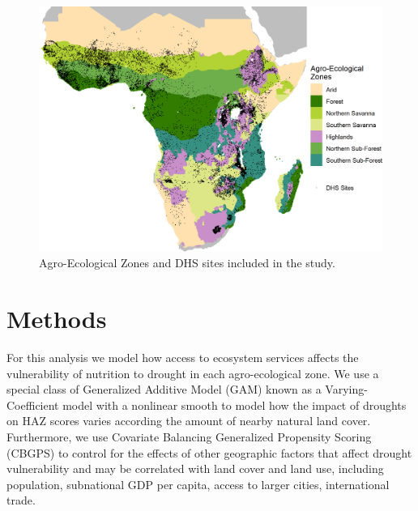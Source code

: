 \documentclass{article}
\begin{document}
\begin{figure}[h]
	\centering
	\includegraphics[width=0.8\linewidth]{AEZ_Sites.png}
	\caption{Agro-Ecological Zones and DHS sites included in the study.}
	\label{fig:AEZmap}
\end{figure}

\section{Methods}
For this analysis we model how access to ecosystem services affects the vulnerability of nutrition to drought in each agro-ecological zone.  We use a special class of Generalized Additive Model (GAM) known as a Varying-Coefficient model \cite{Wood2017} with a nonlinear smooth to model how the impact of droughts on HAZ scores varies according the amount of nearby natural land cover.  Furthermore, we use Covariate Balancing Generalized Propensity Scoring (CBGPS) \citep{imai2014covariate} to control for the effects of other geographic factors that affect drought vulnerability and may be correlated with land cover and land use, including population, subnational GDP per capita, access to larger cities, international trade.
\end{document}
